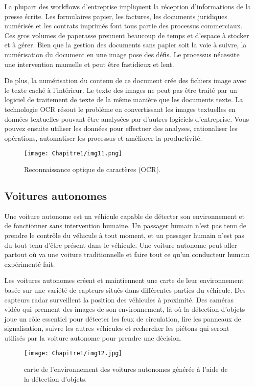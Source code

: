      La plupart des workflows d'entreprise impliquent la réception d'informations de la presse écrite. Les formulaires papier, les factures, les documents juridiques numérisés et les contrats imprimés font tous partie des processus commerciaux. Ces gros volumes de paperasse prennent beaucoup de temps et d'espace à stocker et à gérer. Bien que la gestion des documents sans papier soit la voie à suivre, la numérisation du document en une image pose des défis. Le processus nécessite une intervention manuelle et peut être fastidieux et lent.

     De plus, la numérisation du contenu de ce document crée des fichiers image avec le texte caché à l'intérieur. Le texte des images ne peut pas être traité par un logiciel de traitement de texte de la même manière que les documents texte. La technologie OCR résout le problème en convertissant les images textuelles en données textuelles pouvant être analysées par d'autres logiciels d'entreprise. Vous pouvez ensuite utiliser les données pour effectuer des analyses, rationaliser les opérations, automatiser les processus et améliorer la productivité.
     \begin{figure}[H]
          \centering
          \texttt{[image: Chapitre1/img11.png]}
          \caption{Reconnaissance optique de caractères (OCR).}
          \label{img11}
          \end{figure}
     
     \subsection{Voitures autonomes}
     Une voiture autonome est un véhicule capable de détecter son environnement et de fonctionner sans intervention humaine. Un passager humain n'est pas tenu de prendre le contrôle du véhicule à tout moment, et un passager humain n'est pas du tout tenu d'être présent dans le véhicule. Une voiture autonome peut aller partout où va une voiture traditionnelle et faire tout ce qu'un conducteur humain expérimenté fait.

     Les voitures autonomes créent et maintiennent une carte de leur environnement basée sur une variété de capteurs situés dans différentes parties du véhicule. Des capteurs radar surveillent la position des véhicules à proximité. Des caméras vidéo qui prennent des images de son environnement, là où la détection d'objets joue un rôle essentiel pour détecter les feux de circulation, lire les panneaux de signalisation, suivre les autres véhicules et rechercher les piétons qui seront utilisés par la voiture autonome pour prendre une décision.
     \begin{figure}[H]
          \centering
          \texttt{[image: Chapitre1/img12.jpg]}
          \caption{carte de l'environnement des voitures autonomes générée à l'aide de la détection d'objets.}
          \label{img12}
          \end{figure}
     
